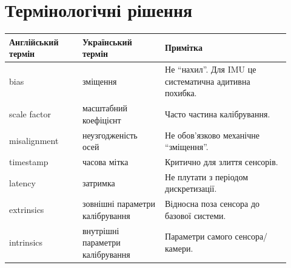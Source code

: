 \section{Термінологічні рішення}

\begin{longtable}{L{0.24\linewidth}L{0.27\linewidth}L{0.41\linewidth}}
\toprule
Англійський термін & Український термін & Примітка\\
\midrule
bias & зміщення & Не ``нахил''. Для IMU це систематична адитивна похибка.\\
scale factor & масштабний коефіцієнт & Часто частина калібрування.\\
misalignment & неузгодженість осей & Не обов'язково механічне ``зміщення''.\\
timestamp & часова мітка & Критично для злиття сенсорів.\\
latency & затримка & Не плутати з періодом дискретизації.\\
extrinsics & зовнішні параметри калібрування & Відносна поза сенсора до базової системи.\\
intrinsics & внутрішні параметри калібрування & Параметри самого сенсора/камери.\\
\bottomrule
\end{longtable}
